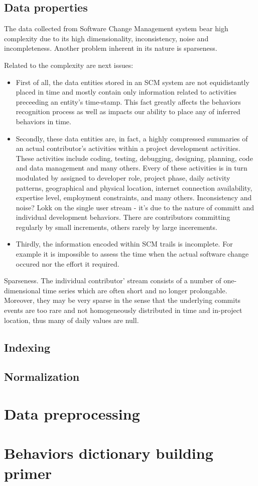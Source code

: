 \documentclass[10pt]{article}
\begin{document}
\subsection{Data properties}
The data collected from Software Change Management system bear high complexity due to its 
high dimensionality, inconsistency, noise and incompleteness. Another problem inherent in 
its nature is sparseness. 

Related to the complexity are next issues:
\begin{itemize}
 \item First of all, the data entities stored in an 
   SCM system are not equidistantly placed in time and mostly contain only information 
   related to activities preceeding an entity's time-stamp. This fact greatly affects 
   the behaviors recognition process as well as impacts our ability to place any of 
   inferred behaviors in time.
 \item Secondly, these data entities are, in fact, a highly compressed summaries of an 
   actual contributor's activities within a project development activities. These activities 
   include coding, testing, debugging, designing, planning, code and data management 
   and many others. Every of these activities is in turn modulated by assigned to developer role, 
   project phase, daily activity patterns, geographical and physical location, internet 
   connection availability, expertise level, employment constraints, and many others.
   Inconsistency and noise? Lokk on the single user stream - it's due to the nature of 
    committ and individual development behaviors. There are
   contributors committing regularly by small increments, others rarely by large incerements. 
 \item Thirdly, the information encoded within SCM trails is incomplete. For example it is
   impossible to assess the time when the actual software change occured nor the effort it 
   required.
\end{itemize}

Sparseness. The individual contributor' stream consists of a number of one-dimensional time series
which are often short and no longer prolongable. Moreover, they may be very sparse in the sense 
that the underlying commits events are too rare and not homogeneously distributed in time and 
in-project location, thus many of daily values are null.

\subsection{Indexing}

\subsection{Normalization}

\section{Data preprocessing}

\section{Behaviors dictionary building primer}

%
%


\end{document}
